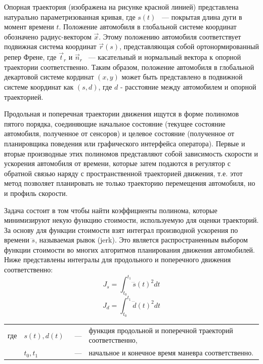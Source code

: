 Опорная траектория (изображена на рисунке красной линией) представлена натурально параметризованная кривая, где $s(t)$
~--- покрытая длина дуги в момент времени $t$. Положение автомобиля в глобальной системе координат обозначено
радиус-вектором $\vec{x}$. Этому положению автомобиля соответствует подвижная система координат $\vec{r}(s)$,
представляющая собой ортонормированный репер Френе, где $\vec{t}_r$ и $\vec{n}_r$ ~--- касательный и нормальный вектора
к опорной траектории соответственно. Таким образом, положение автомобиля в глобальной декартовой системе кординат
$(x, y)$ может быть представлено в подвижной системе координат как $(s, d)$, где $d$ - расстояние между автомобилем и
опорной траекторией.

Продольная и поперечная траектории движения ищутся в форме полиномов пятого порядка, соединяющие начальное состояние
(текущее состояние автомобиля, полученное от сенсоров) и целевое состояние (полученное от планировщика поведения или
графического интерфейса оператора). Первые и вторые производные этих
полиномов представляют собой зависимость скорости и ускорения автомобиля от времени, которые затем подаются в регулятор
с обратной связью наряду с пространственной траекторией движения, т.е. этот метод позволяет планировать не только
траекторию перемещения автомобиля, но и профиль скорости.

Задача состоит в том чтобы найти коэффициенты полинома, которые минимизируют некую функцию стоимости, используемую для
оценки траекторий. За основу для функции стоимости взят интеграл производной ускорения по времени $\dddot{s}$,
называемая рывок (jerk). Это является распространенным выбором функции стоимости во многих алгоритмов планирования
движения автомобилей. Ниже представлены интегралы для продольного и поперечного движения соответственно:
\begin{equation}
      J_s = \int_{t_0}^{t_1}{\dddot{s}(t)^2dt}
\end{equation}
\begin{equation}
      J_d = \int_{t_0}^{t_1}{\dddot{d}(t)^2dt}
\end{equation}

\noindent\begin{tabularx}{\linewidth}{lllX}
      где & $s(t), d(t)$ &~---& функция продольной и поперечной траекторий соответственно, \\
          & $t_0, t_1$   &~---& начальное и конечное время маневра соответственно. \\
\end{tabularx}

